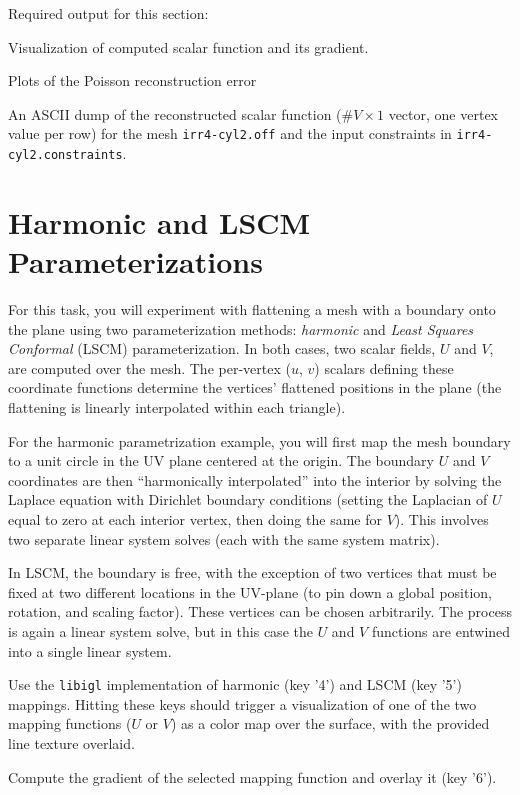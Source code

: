 \documentclass[11pt]{amsart}
\newcommand{\itemz}[1]{{\begin{itemize}{#1}\end{itemize}}}
\begin{document}
Required output for this section:
\itemz{
\item{Visualization of computed scalar function and its gradient.}
\item{Plots of the Poisson reconstruction error}
\item{An ASCII dump of the reconstructed scalar function ($\#V \times 1$ vector,
    one vertex value per row) for the mesh \texttt{irr4-cyl2.off} and the input
    constraints in \texttt{irr4-cyl2.constraints}. }
}

\section{Harmonic and LSCM Parameterizations}
For this task, you will experiment with flattening a mesh with a boundary onto
the plane using two parameterization methods: \emph{harmonic} and \emph{Least
Squares Conformal} (LSCM) parameterization. In both cases, two scalar fields,
$U$ and $V$, are computed over the mesh. The per-vertex ($u$, $v$) scalars
defining these coordinate functions determine the vertices' flattened positions
in the plane (the flattening is linearly interpolated within each triangle). 

For the harmonic parametrization example, you will first map the mesh boundary
to a unit circle in the UV plane centered at the origin. The boundary $U$ and
$V$ coordinates are then ``harmonically interpolated'' into the interior by
solving the Laplace equation with Dirichlet boundary conditions (setting the
Laplacian of $U$ equal to zero at each interior vertex, then doing the same for
$V$). This involves two separate linear system solves (each with the same
system matrix).

In LSCM, the boundary is free, with the exception of two vertices that must be
fixed at two different locations in the UV-plane (to pin down a global
position, rotation, and scaling factor). These vertices can be chosen
arbitrarily. The process is again a linear system solve, but in this case the
$U$ and $V$ functions are entwined into a single linear system.

\itemz{
\item Use the \texttt{libigl} implementation of harmonic (key '4') and
    LSCM (key '5') mappings. Hitting these keys should trigger a visualization
    of one of the two mapping functions ($U$ or $V$) as a color map over the
    surface, with the provided line texture overlaid.
\item Compute the gradient of the selected mapping function and overlay it (key '6').
}
\end{document}

